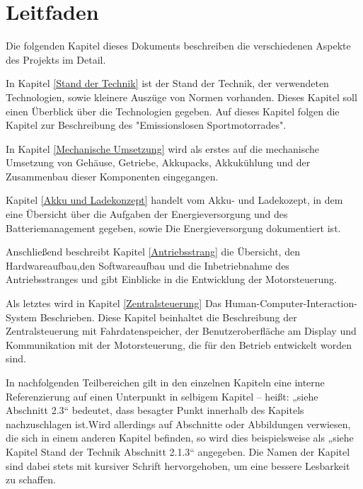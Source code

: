 \newpage

\section{Leitfaden}

Die folgenden Kapitel dieses Dokuments beschreiben die verschiedenen Aspekte des Projekts im Detail. 

In Kapitel \ref{Stand der Technik} ist der Stand der Technik, der verwendeten Technologien, sowie kleinere Auszüge von Normen vorhanden. Dieses Kapitel soll einen Überblick über die Technologien gegeben. Auf dieses Kapitel folgen die Kapitel zur Beschreibung des "Emissionslosen Sportmotorrades". 

In Kapitel \ref{Mechanische Umsetzung} wird als erstes auf die mechanische Umsetzung von Gehäuse, Getriebe, Akkupacks, Akkukühlung und der Zusammenbau dieser Komponenten eingegangen. 

Kapitel \ref{Akku und Ladekonzept} handelt vom Akku- und Ladekozept, in dem eine Übersicht über die Aufgaben der Energieversorgung und des Batteriemanagement gegeben, sowie Die Energieversorgung dokumentiert ist. 

Anschließend beschreibt Kapitel \ref{Antriebsstrang} die Übersicht, den Hardwareaufbau,den Softwareaufbau und die Inbetriebnahme des Antriebsstranges und gibt Einblicke in die Entwicklung der Motorsteuerung. 

Als letztes wird in Kapitel \ref{Zentralsteuerung} Das Human-Computer-Interaction-System Beschrieben. Diese Kapitel beinhaltet die Beschreibung der Zentralsteuerung mit Fahrdatenspeicher, der Benutzeroberfläche am Display und Kommunikation mit der Motorsteuerung, die für den Betrieb entwickelt worden sind.

In nachfolgenden Teilbereichen gilt in den einzelnen Kapiteln eine interne Referenzierung auf einen Unterpunkt in selbigem Kapitel – heißt: „siehe Abschnitt 2.3“ bedeutet, dass besagter Punkt innerhalb des Kapitels nachzuschlagen ist.Wird allerdings auf Abschnitte oder Abbildungen verwiesen, die sich in einem anderen Kapitel befinden, so wird dies beispielsweise als „siehe Kapitel Stand der Technik Abschnitt 2.1.3“ angegeben. Die Namen der Kapitel sind dabei stets mit kursiver Schrift hervorgehoben, um eine bessere Lesbarkeit zu schaffen.
